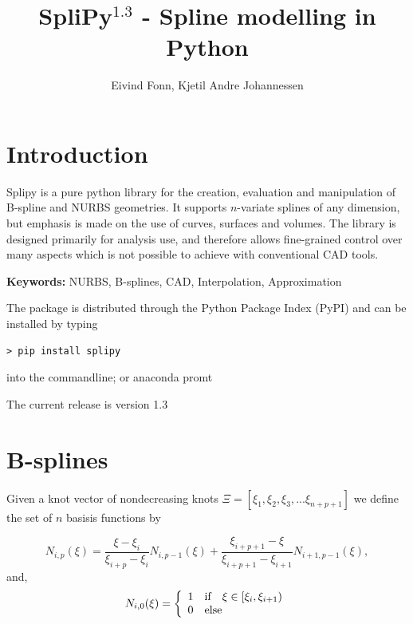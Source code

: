 \documentclass[landscape]{sintefposter}
\title{SpliPy$^{1.3}$ - Spline modelling in Python}
\author{Eivind Fonn, Kjetil Andre Johannessen }
\institute{SINTEF Digital, Dept. of Mathematics and Cybernetics, Trondheim, Norway}
\begin{document}
\maketitle

\begin{multicols}{3}
\section{Introduction}
\begin{tcolorbox}[colback=sintefblue!10!white,colframe=sintefblue,title=Abstract]
  Splipy is a pure python library for the creation, evaluation and manipulation of B-spline and NURBS geometries.
  It supports $n$-variate splines of any dimension, but emphasis is made on the use of curves, surfaces and volumes.
  The library is designed primarily for analysis use, and therefore allows fine-grained control over many aspects which is not possible to achieve with conventional CAD tools.
\end{tcolorbox}
\textbf{Keywords:} NURBS, B-splines, CAD, Interpolation, Approximation
\vspace{2cm}

\begin{tcolorbox}[colback=white,colframe=sintefblue,title=Installation]
  The package is distributed through the Python Package Index (PyPI) and can be installed by typing
  \begin{tcolorbox}[colback=sinteflightgrey]
  \begin{verbatim}
> pip install splipy \end{verbatim}
  \end{tcolorbox}
  into the commandline; or anaconda promt
\end{tcolorbox}
The current release is version 1.3

\section{B-splines}
Given a knot vector of nondecreasing knots $\Xi=[\xi_1, \xi_2, \xi_3, ... \xi_{n+p+1}]$ we define the set of $n$ basisis functions by
\begin{tcolorbox}[colback=sintefblue!10!white,colframe=sintefblue,title=The basis]
  \begin{equation}
    \label{eq:bspline}
    N_{i,p}(\xi) = \frac{\xi - \xi_i}{\xi_{i+p}-\xi_i}N_{i,p-1}(\xi) + \frac{\xi_{i+p+1}-\xi}{\xi_{i+p+1}-\xi_{i+1}}N_{i+1,p-1}(\xi),
  \end{equation}
  and,
  \begin{equation}
    \label{eq:bspline-start}
    N_{i,0}(\xi) = \left\{
    \begin{array}{ll}
      1  &  $if $ \ \ \xi \in [\xi_i, \xi_{i+1}) \\
      0  &  $else$
    \end{array}
    \right.
  \end{equation}
\end{tcolorbox}


\end{multicols}
\end{document}
